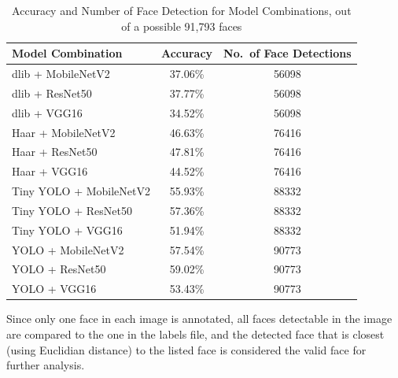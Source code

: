 \begin{table}[h!]
\centering{}
\caption{Accuracy and Number of Face Detection for Model Combinations, out of a possible 91,793 faces}
\begin{tabular}{|l|c|c|}
\hline
\textbf{Model Combination}   & \textbf{Accuracy} & \textbf{No.\ of Face Detections} \\ \hline
dlib + MobileNetV2           & 37.06\%           & 56098                                   \\ \hline
dlib + ResNet50              & 37.77\%            & 56098                                   \\ \hline
dlib + VGG16                 & 34.52\%            & 56098                                   \\ \hline
Haar + MobileNetV2           & 46.63\%            & 76416                                   \\ \hline
Haar + ResNet50              & 47.81\%            & 76416                                   \\ \hline
Haar + VGG16                 & 44.52\%            & 76416                                   \\ \hline
Tiny YOLO + MobileNetV2      & 55.93\%            & 88332                                   \\ \hline
Tiny YOLO + ResNet50         & 57.36\%            & 88332                                   \\ \hline
Tiny YOLO + VGG16            & 51.94\%            & 88332                                   \\ \hline
YOLO + MobileNetV2           & 57.54\%            & 90773                                   \\ \hline
YOLO + ResNet50              & 59.02\%            & 90773                                   \\ \hline
YOLO + VGG16                 & 53.43\%            & 90773                                   \\ \hline
\end{tabular}
\label{tab:model_combinations_accuracy}
\end{table}

Since only one face in each image is annotated, all faces detectable in the image are compared to the one in the labels file, and the detected face that is closest (using Euclidian distance) to the listed face is considered the valid face for further analysis.


